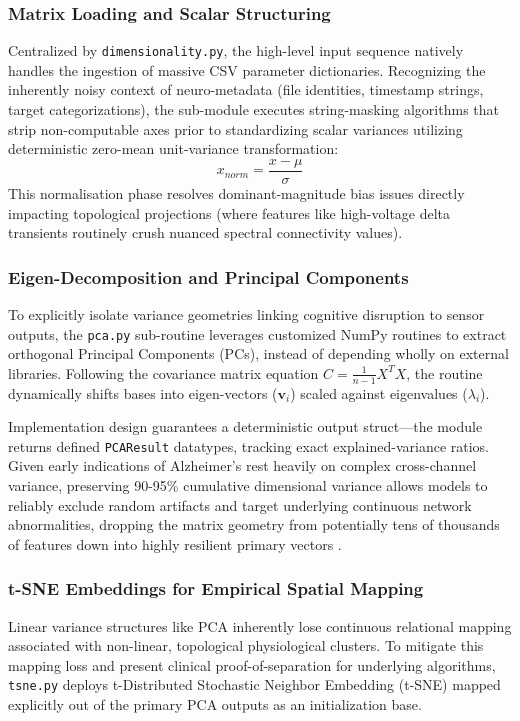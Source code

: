 \subsubsection{Matrix Loading and Scalar Structuring}
Centralized by \texttt{dimensionality.py}, the high-level input sequence natively handles the ingestion of massive CSV parameter dictionaries. Recognizing the inherently noisy context of neuro-metadata (file identities, timestamp strings, target categorizations), the sub-module executes string-masking algorithms that strip non-computable axes prior to standardizing scalar variances utilizing deterministic zero-mean unit-variance transformation: 
\begin{equation}
    x_{norm} = \frac{x - \mu}{\sigma}
\end{equation}
This normalisation phase resolves dominant-magnitude bias issues directly impacting topological projections (where features like high-voltage delta transients routinely crush nuanced spectral connectivity values).

\subsubsection{Eigen-Decomposition and Principal Components}
To explicitly isolate variance geometries linking cognitive disruption to sensor outputs, the \texttt{pca.py} sub-routine leverages customized NumPy routines to extract orthogonal Principal Components (PCs), instead of depending wholly on external libraries. Following the covariance matrix equation $C = \frac{1}{n-1} X^T X$, the routine dynamically shifts bases into eigen-vectors ($\mathbf{v}_i$) scaled against eigenvalues ($\lambda_i$).

Implementation design guarantees a deterministic output struct—the module returns defined \texttt{PCAResult} datatypes, tracking exact explained-variance ratios. Given early indications of Alzheimer's rest heavily on complex cross-channel variance, preserving 90-95\% cumulative dimensional variance allows models to reliably exclude random artifacts and target underlying continuous network abnormalities, dropping the matrix geometry from potentially tens of thousands of features down into highly resilient primary vectors \cite{acharya2018automated}. 

\subsubsection{t-SNE Embeddings for Empirical Spatial Mapping}
Linear variance structures like PCA inherently lose continuous relational mapping associated with non-linear, topological physiological clusters. To mitigate this mapping loss and present clinical proof-of-separation for underlying algorithms, \texttt{tsne.py} deploys t-Distributed Stochastic Neighbor Embedding (t-SNE) mapped explicitly out of the primary PCA outputs as an initialization base.

